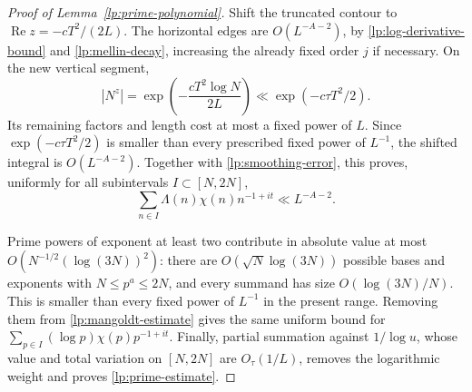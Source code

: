 \begin{proof}[Proof of Lemma~\ref{lp:prime-polynomial}]
Shift the truncated contour to
$\operatorname{Re}z=-cT^2/(2L)$.
The horizontal edges are $O(L^{-A-2})$, by
\eqref{lp:log-derivative-bound} and \eqref{lp:mellin-decay}, increasing
the already fixed order $j$ if necessary.
On the new vertical segment,
\[
 |N^z|=\exp\left(-\frac{cT^2\log N}{2L}\right)
       \ll\exp(-c\tau T^2/2).
\]
Its remaining factors and length cost at most a fixed power of $L$.
Since $\exp(-c\tau T^2/2)$ is smaller than every prescribed fixed
power of $L^{-1}$, the shifted integral is $O(L^{-A-2})$.
Together with \eqref{lp:smoothing-error}, this proves, uniformly for
all subintervals $I\subset[N,2N]$,
\begin{equation}\label{lp:mangoldt-estimate}
 \sum_{n\in I}\Lambda(n)\chi(n)n^{-1+it}\ll L^{-A-2}.
\end{equation}

Prime powers of exponent at least two contribute in absolute value at
most $O(N^{-1/2}(\log(3N))^2)$: there are
$O(\sqrt N\log(3N))$ possible bases and exponents with
$N\le p^a\le2N$, and every summand has size $O(\log(3N)/N)$.
This is smaller than every fixed power of $L^{-1}$ in the present
range.  Removing them from \eqref{lp:mangoldt-estimate} gives the
same uniform bound for
$\sum_{p\in I}(\log p)\chi(p)p^{-1+it}$.
Finally, partial summation against $1/\log u$, whose value and total
variation on $[N,2N]$ are $O_{\tau}(1/L)$, removes the logarithmic
weight and proves \eqref{lp:prime-estimate}.
\end{proof}
